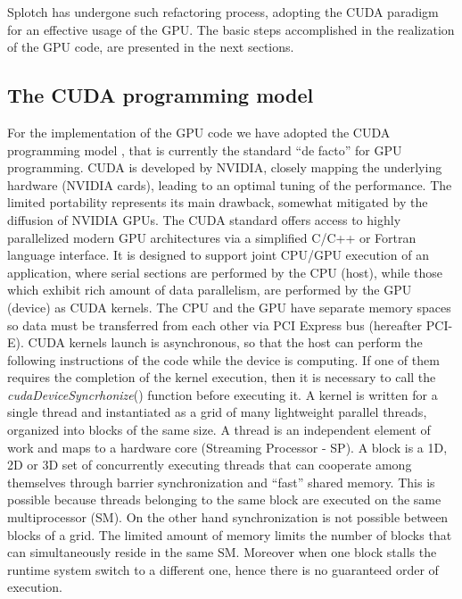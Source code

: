 \documentclass[11pt]{article}
\begin{document}
Splotch has undergone such refactoring process, adopting the CUDA paradigm 
for an effective usage of the GPU. The basic steps accomplished in
the realization of the GPU code, are presented in the next sections. 


\subsection{The CUDA programming model} 
\label{sec:cuda}

For the implementation of the GPU code we have adopted the CUDA 
programming model \cite{cudaurl},
that is currently the standard ``de facto'' for GPU programming.
CUDA is developed by NVIDIA, closely mapping the underlying
hardware (NVIDIA cards), leading to an optimal tuning of the performance.
The limited portability represents its main drawback, somewhat mitigated
by the diffusion of NVIDIA GPUs.
The CUDA standard offers access to highly parallelized modern GPU architectures via a simplified C/C++ or Fortran language interface. It is designed to support joint CPU/GPU execution of an application, where serial sections are performed by the CPU (host), while those which exhibit rich amount of data parallelism, are performed by the GPU (device) as CUDA kernels. The CPU and the GPU have separate memory spaces so data must be transferred from each other via PCI Express 
bus (hereafter PCI-E). 
CUDA kernels launch is asynchronous, so that the host can
 perform the following instructions of the code while the device is computing. If one of them requires the completion 
of the kernel execution, then it is necessary to call the \textit{cudaDeviceSyncrhonize}() function before executing it.
A kernel is written for a single thread and instantiated as a grid of many lightweight parallel threads, organized into blocks of the same size. A thread is an independent element of work and maps to a hardware core (Streaming Processor - SP). A block is a 1D, 2D or 3D set of concurrently executing threads that can cooperate among themselves through barrier synchronization and ``fast'' shared memory. 
This is possible because threads belonging to the same block are executed on the same multiprocessor (SM). On the other hand
 synchronization is not possible between blocks of a grid. The limited amount of memory limits the number of 
blocks that can simultaneously reside in the same SM. Moreover when one block stalls the runtime system switch to 
a different one, hence there is no guaranteed order of execution.
\end{document}
